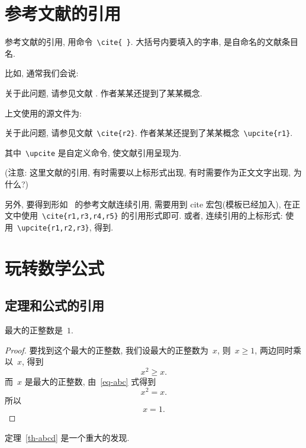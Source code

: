 \documentclass[forprint]{YAUthesis}
\begin{document}
\section{参考文献的引用}



参考文献的引用, 用命令~\verb|\cite{ }|. 大括号内要填入的字串, 是自命名的文献条目名.

比如, 通常我们会说:

 {\kaishu
关于此问题, 请参见文献 \cite{r2}. 作者某某还提到了某某概念.}


上文使用的源文件为:

 {\kaishu
关于此问题, 请参见文献~\verb|\cite{r2}|. 作者某某还提到了某某概念~\verb|\upcite{r1}|.
}

其中~\verb|\upcite| 是自定义命令, 使文献引用呈现为.

({\heiti 注意:} {\kaishu 这里文献的引用, 有时需要以上标形式出现, 有时需要作为正文文字出现, 为什么?})

另外, 要得到形如~\cite{r1,r3,r4,r5} 的参考文献连续引用, 需要用到 cite 宏包(模板已经加入),
在正文中使用~\verb|\cite{r1,r3,r4,r5}| 的引用形式即可.
或者, 连续引用的上标形式: 使用~\verb|\upcite{r1,r2,r3}|, 得到.


\section{玩转数学公式}

\subsection{定理和公式的引用}

\begin{theorem}[谁发现的]\label{th-abcd}
最大的正整数是~$1$.
\end{theorem}

\begin{proof}
要找到这个最大的正整数, 我们设最大的正整数为~$x$, 则~$x \geqslant 1$, 两边同时乘以~$x$, 得到
\begin{equation}\label{eq-abc}
x^2 \geqslant x.
\end{equation}
而~$x$ 是最大的正整数, 由~\eqref{eq-abc} 式得到
\[
x^2 = x.
\]
所以
\begin{equation*}
x = 1.
\end{equation*}
\end{proof}

定理~\ref{th-abcd} 是一个重大的发现.
\end{document}
